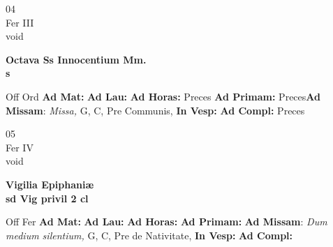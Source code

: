 \documentclass[10pt, openany]{book}
\begin{document}
    \begin{center}
        \begin{minipage}{3.5in}
            \vspace{2em}
            \begin{minipage}{0.5in}
                {\Huge 04} \\
                {\normalsize Fer III} \\
                {\normalsize void}
            \end{minipage}
            \begin{minipage}{3.0in}
                \textbf{ \large Octava Ss Innocentium Mm. \\
                \textnormal{\normalsize s}} \\ 
            \end{minipage}
            \begin{justify}Off Ord
                \textbf{Ad Mat: }
                \textbf{Ad Lau: }
                \textbf{Ad Horas: }Preces
                \textbf{Ad Primam: }Preces\textbf{Ad Missam}: \textit{Missa,} G, C, Pre Communis,  
                \textbf{In Vesp: }
                \textbf{Ad Compl: }Preces
            \end{justify}
        \end{minipage}
    \end{center}

    \begin{center}
        \begin{minipage}{3.5in}
            \vspace{2em}
            \begin{minipage}{0.5in}
                {\Huge 05} \\
                {\normalsize Fer IV} \\
                {\normalsize void}
            \end{minipage}
            \begin{minipage}{3.0in}
                \textbf{ \large Vigilia Epiphaniæ \\
                \textnormal{\normalsize sd Vig privil 2 cl}} \\ 
            \end{minipage}
            \begin{justify}Off Fer
                \textbf{Ad Mat: }
                \textbf{Ad Lau: }
                \textbf{Ad Horas: }
                \textbf{Ad Primam: }\textbf{Ad Missam}: \textit{Dum medium silentium,} G, C, Pre de Nativitate,  
                \textbf{In Vesp: }
                \textbf{Ad Compl: }
            \end{justify}
        \end{minipage}
    \end{center}
\end{document}
